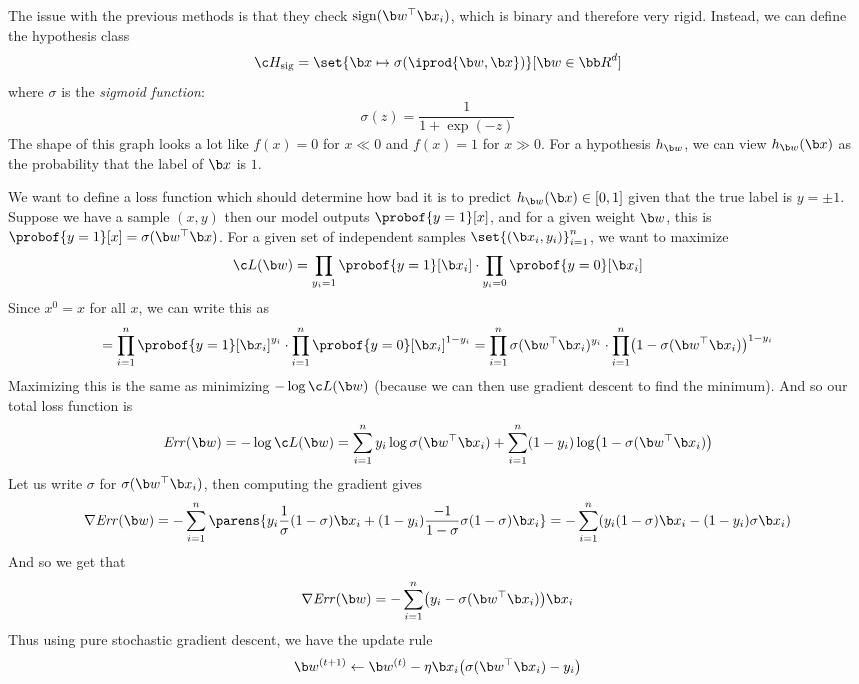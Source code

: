 The issue with the previous methods is that they check ${\rm sign}(\b w^\top\b x_i)$, which is binary and therefore very rigid.
Instead, we can define the hypothesis class
$$ \c H_{\rm sig} = \set{\b x\mapsto\sigma(\iprod{\b w,\b x})}[\b w\in{\bb R}^d] $$
where $\sigma$ is the {\it sigmoid function}:
$$ \sigma(z) = \frac1{1+\exp(-z)} $$
The shape of this graph looks a lot like $f(x)=0$ for $x\ll0$ and $f(x)=1$ for $x\gg0$.
For a hypothesis $h_{\b w}$, we can view $h_{\b w}(\b x)$ as the probability that the label of $\b x$ is $1$.

We want to define a loss function which should determine how bad it is to predict $h_{\b w}(\b x)\in[0,1]$ given that the true label is $y=\pm1$.
Suppose we have a sample $(x,y)$ then our model outputs $\probof{y=1}[x]$, and for a given weight $\b w$, this is $\probof{y=1}[x]=\sigma(\b w^\top\b x)$.
For a given set of independent samples $\set{(\b x_i,y_i)}_{i=1}^n$, we want to maximize
$$ \c L(\b w) = \prod_{y_i=1}\probof{y=1}[\b x_i]\cdot\prod_{y_i=0}\probof{y=0}[\b x_i] $$
Since $x^0=x$ for all $x$, we can write this as
$$ = \prod_{i=1}^n\probof{y=1}[\b x_i]^{y_i}\cdot\prod_{i=1}^n\probof{y=0}[\b x_i]^{1-y_i} = \prod_{i=1}^n\sigma(\b w^\top\b x_i)^{y_i}\cdot\prod_{i=1}^n\bigl(1-\sigma(\b w^\top\b x_i)\bigr)^{1-y_i} $$
Maximizing this is the same as minimizing $-\log\c L(\b w)$ (because we can then use gradient descent to find the minimum).
And so our total loss function is
$$ {\it Err}(\b w) = -\log\c L(\b w) = \sum_{i=1}^ny_i\log\sigma(\b w^\top\b x_i) + \sum_{i=1}^n(1-y_i)\log\bigl(1-\sigma(\b w^\top\b x_i)\bigr) $$
Let us write $\sigma$ for $\sigma(\b w^\top\b x_i)$, then computing the gradient gives
$$ \nabla{\it Err}(\b w) = -\sum_{i=1}^n\parens{y_i\frac1\sigma(1-\sigma)\b x_i+(1-y_i)\frac{-1}{1-\sigma}\sigma(1-\sigma)\b x_i} = -\sum_{i=1}^n(y_i(1-\sigma)\b x_i - (1-y_i)\sigma\b x_i) $$
And so we get that
$$ \nabla{\it Err}(\b w) = -\sum_{i=1}^n\bigl(y_i-\sigma(\b w^\top\b x_i)\bigr)\b x_i $$
Thus using pure stochastic gradient descent, we have the update rule
$$ \b w^{(t+1)} \gets \b w^{(t)} - \eta\b x_i\bigl(\sigma(\b w^\top\b x_i)-y_i\bigr) $$


